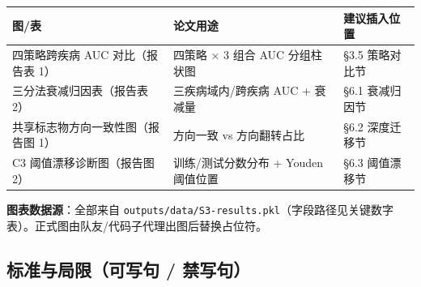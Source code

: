 \documentclass{article}   %
\begin{document}
\begin{center}
\footnotesize
\begin{tabular}{lll}
\toprule
图/表 & 论文用途 & 建议插入位置 \\
\midrule
四策略跨疾病 AUC 对比（报告表 1） & 四策略 $\times$ 3 组合 AUC 分组柱状图 & §3.5 策略对比节 \\
三分法衰减归因表（报告表 2） & 三疾病域内/跨疾病 AUC + 衰减量 & §6.1 衰减归因节 \\
共享标志物方向一致性图（报告图 1） & 方向一致 vs 方向翻转占比 & §6.2 深度迁移节 \\
C3 阈值漂移诊断图（报告图 2） & 训练/测试分数分布 + Youden 阈值位置 & §6.3 阈值漂移节 \\
\bottomrule
\end{tabular}
\end{center}

\textbf{图表数据源}：全部来自 \texttt{outputs/data/S3-results.pkl}（字段路径见关键数字表）。正式图由队友/代码子代理出图后替换占位符。

\subsection{标准与局限（可写句 / 禁写句）}
\end{document}
